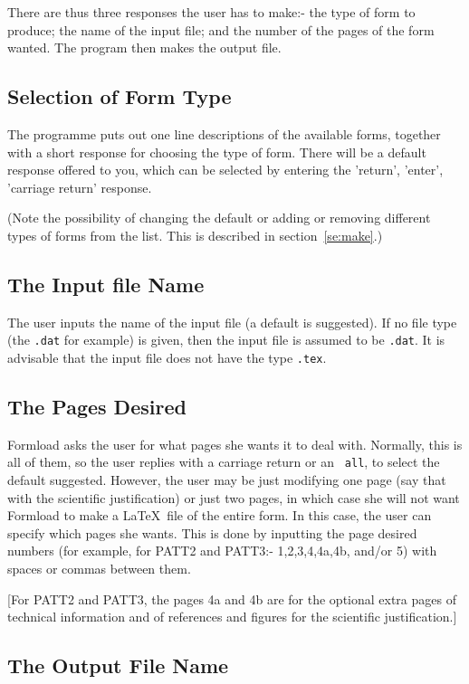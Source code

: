 There are thus three responses the user has to make:- the type of form to
produce; the name of the input file; and the number of the pages of the
form wanted. The program then makes the output file. 

\subsection{Selection of Form Type}

The programme puts out one line descriptions of the available forms, together
with a short response for choosing the type of form. There will be a 
default response offered to you, which can be selected by entering the
'return', 'enter', 'carriage return' response.

(Note the possibility of changing the default or adding or removing
different types of forms from the list. This is described in 
section~\ref{se:make}.)

\subsection{The Input file Name}

The user inputs the name of the input file (a default is suggested). If no
file type (the {\tt .dat} for example) is given, then the input file is
assumed to be {\tt .dat}. It is advisable that the input file does not have
the type {\tt .tex}. 

\subsection{The Pages Desired}

Formload asks the user for what pages she wants it to deal with. Normally,
this is all of them, so the user replies with a carriage return or an {\tt
all}, to select the default suggested. However, the user may be just
modifying one page (say that with the scientific justification) or just two
pages, in which case she will not want Formload to make a \LaTeX\ file of
the entire form. In this case, the user can specify which pages she wants.
This is done by inputting the page desired numbers (for example, for PATT2
and PATT3:- 1,2,3,4,4a,4b, and/or 5) with spaces or commas between them. 

[For PATT2 and PATT3, the pages 4a and 4b are for the optional extra pages
of technical information and of references and figures for the scientific
justification.] 

\subsection{The Output File Name}

